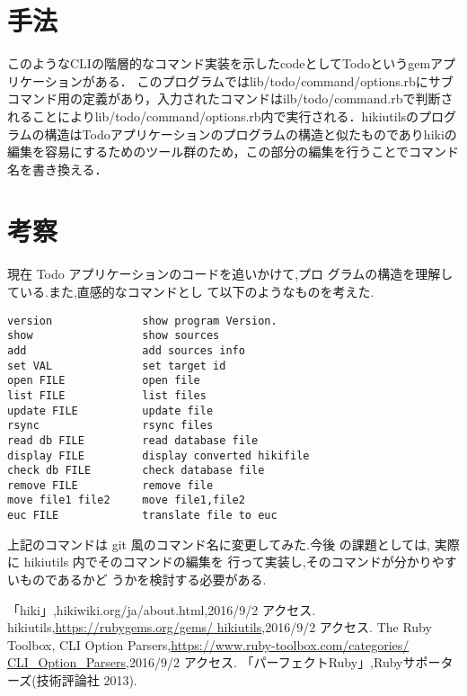 \documentclass[a4j,twocolumn]{jsarticle}
\begin{document}
\section{手法}
このようなCLIの階層的なコマンド実装を示したcodeとしてTodoというgemアプリケーションがある\cite{PerfectRuby}．
このプログラムではlib/todo/command/options.rbにサブコマンド用の定義があり，入力されたコマンドはilb/todo/command.rbで判断されることによりlib/todo/command/options.rb内で実行される．hikiutilsのプログラムの構造はTodoアプリケーションのプログラムの構造と似たものでありhikiの編集を容易にするためのツール群のため，この部分の編集を行うことでコマンド名を書き換える．

\section{考察}
現在 Todo アプリケーションのコードを追いかけて,プロ グラムの構造を理解している.また,直感的なコマンドとし て以下のようなものを考えた.
\begin{verbatim}
version              show program Version.
show                 show sources
add                  add sources info
set VAL              set target id
open FILE            open file
list FILE            list files
update FILE          update file
rsync                rsync files
read db FILE         read database file
display FILE         display converted hikifile
check db FILE        check database file
remove FILE          remove file
move file1 file2     move file1,file2
euc FILE             translate file to euc
\end{verbatim}
上記のコマンドは git 風のコマンド名に変更してみた.今後 の課題としては, 実際に hikiutils 内でそのコマンドの編集を 行って実装し,そのコマンドが分かりやすいものであるかど うかを検討する必要がある.

\begin{thebibliography}{9}
「hiki」,hikiwiki.org/ja/about.html,2016/9/2 アクセス.
hikiutils,\url{https://rubygems.org/gems/ hikiutils},2016/9/2 アクセス.
The Ruby Toolbox, CLI Option Parsers,\url{https://www.ruby-toolbox.com/categories/
CLI_Option_Parsers},2016/9/2 アクセス.
「パーフェクトRuby」,Rubyサポーターズ(技術評論社 2013).
\end{thebibliography}
\end{document}
